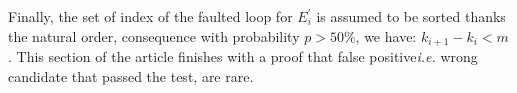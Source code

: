 	Finally, the set of index of the faulted loop for $E^{'}_i$  is assumed to be 
sorted thanks the natural order, consequence with probability $p> 50 \%$, 
we have: $ k_{i+1}-k_{i}<m$. This section of the article finishes with a proof
that false positive\textit{i.e.} wrong candidate that passed the test, are rare.

	

